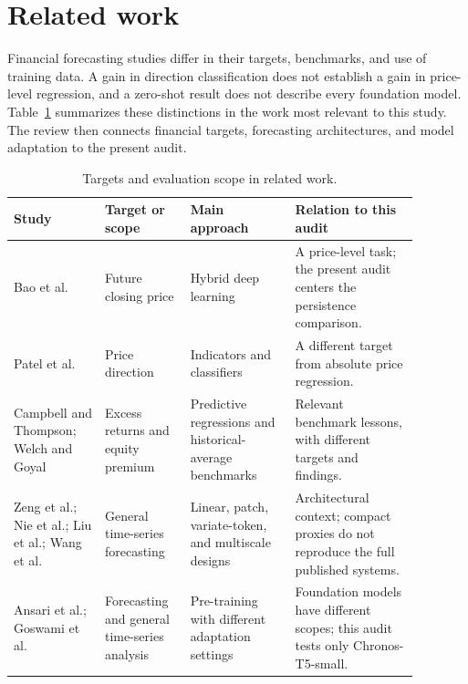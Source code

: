 \section{Related work}

Financial forecasting studies differ in their targets, benchmarks, and use of training data. A gain in direction classification does not establish a gain in price-level regression, and a zero-shot result does not describe every foundation model. Table~\ref{tab:related_scope} summarizes these distinctions in the work most relevant to this study. The review then connects financial targets, forecasting architectures, and model adaptation to the present audit.

\begin{table}[htbp]
\centering
\caption{Targets and evaluation scope in related work.}
\label{tab:related_scope}
\small
\setlength{\tabcolsep}{4pt}
\begin{tabular}{>{\raggedright\arraybackslash}p{0.20\linewidth}>{\raggedright\arraybackslash}p{0.18\linewidth}>{\raggedright\arraybackslash}p{0.23\linewidth}>{\raggedright\arraybackslash}p{0.27\linewidth}}
\toprule
Study & Target or scope & Main approach & Relation to this audit \\
\midrule
Bao et al.\ \cite{bao2017deep} & Future closing price & Hybrid deep learning & A price-level task; the present audit centers the persistence comparison. \\
Patel et al.\ \cite{patel2015trend} & Price direction & Indicators and classifiers & A different target from absolute price regression. \\
Campbell and Thompson; Welch and Goyal\ \cite{campbell2008predicting,welch2008comprehensive} & Excess returns and equity premium & Predictive regressions and historical-average benchmarks & Relevant benchmark lessons, with different targets and findings. \\
Zeng et al.; Nie et al.; Liu et al.; Wang et al.\ \cite{zeng2023transformers,nie2023patchtst,liu2024itransformer,wang2024timemixer} & General time-series forecasting & Linear, patch, variate-token, and multiscale designs & Architectural context; compact proxies do not reproduce the full published systems. \\
Ansari et al.; Goswami et al.\ \cite{ansari2024chronos,goswami2024moment} & Forecasting and general time-series analysis & Pre-training with different adaptation settings & Foundation models have different scopes; this audit tests only Chronos-T5-small. \\
\bottomrule
\end{tabular}
\end{table}

